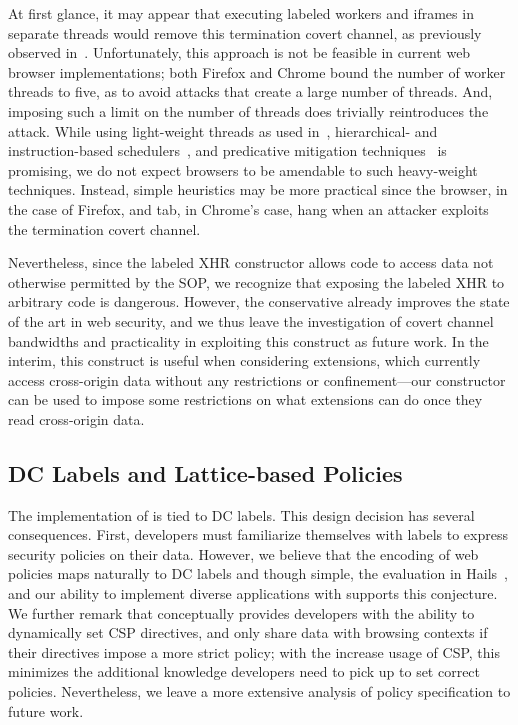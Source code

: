 At first glance, it may appear that executing labeled workers and
iframes in separate threads would remove this termination covert
channel, as previously observed in~\cite{stefan:addressing-covert}. 
%
Unfortunately, this approach is not be feasible in current web browser
implementations; both Firefox and Chrome bound the number of worker
threads to five, as to avoid attacks that create a large number of
threads.
%
And, imposing such a limit on the number of threads does trivially
reintroduces the attack.
%
While using light-weight threads as used
in~\cite{stefan:addressing-covert}, hierarchical- and
instruction-based schedulers~, and predicative
mitigation techniques~\cite{askarov:termination-insensitive} is
promising, we do not expect browsers to be amendable to such
heavy-weight techniques.
%
Instead, simple heuristics may be more practical since the browser,
in the case of Firefox, and tab, in Chrome's case, hang when an
attacker exploits the termination covert channel.

Nevertheless, since the labeled XHR constructor allows code to access
data not otherwise permitted by the SOP, we recognize that exposing
the labeled XHR to arbitrary code is dangerous.
%
However, the conservative \sys{} already improves the state of the art
in web security, and we thus leave the investigation of covert channel
bandwidths and practicality in exploiting this construct as future
work.
%
In the interim, this construct is useful when considering extensions,
which currently access cross-origin data without any restrictions or
confinement---our constructor can be used to impose some restrictions
on what extensions can do once they read cross-origin data.

\subsection{DC Labels and Lattice-based Policies}
\label{sec:discussion:lattice}

The implementation of \sys{} is tied to DC labels.
%
This design decision has several consequences.
%
First, developers must familiarize themselves with labels to express
security policies on their data.
%
However, we believe that the encoding of web policies maps naturally
to DC labels and though simple, the evaluation in
Hails~, and our ability to implement diverse
applications with \sys{} supports this conjecture.
%
We further remark that \sys{} conceptually provides developers with
the ability to dynamically set CSP directives, and only share data
with browsing contexts if their directives impose a more strict
policy; with the increase usage of CSP, this minimizes the additional
knowledge developers need to pick up to set correct policies.
%
Nevertheless, we leave a more extensive analysis of policy
specification to future work.
 
